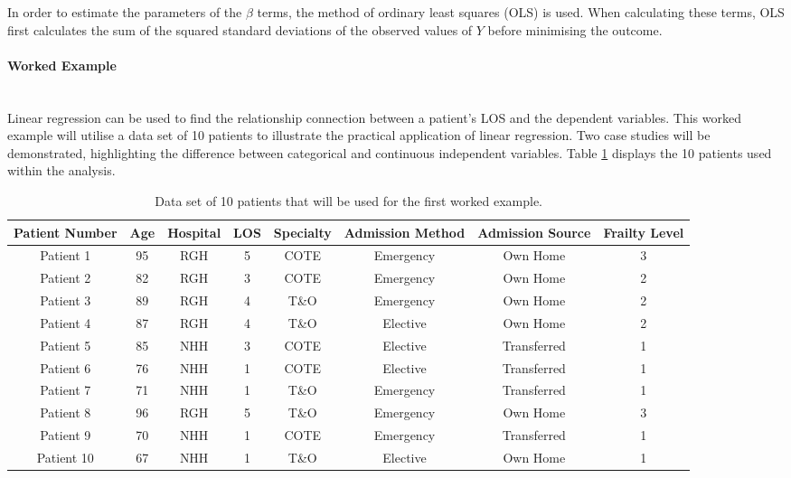 \documentclass[../thesis.tex]{subfiles}
\begin{document}
In order to estimate the parameters of the $\beta$ terms, the method of ordinary least squares (OLS) is used. When calculating these terms, OLS first calculates the sum of the squared standard deviations of the observed values of $Y$ before minimising the outcome.

\paragraph{Worked Example}\\

Linear regression can be used to find the relationship connection between a patient's LOS and the dependent variables.
This worked example will utilise a data set of 10 patients to illustrate the practical application of linear regression. Two case studies will be demonstrated, highlighting the difference between categorical and continuous independent variables. Table \ref{tab:WEtable} displays the 10 patients used within the analysis.

\begin{table}[h!]
    \centering
    \begin{adjustbox}{width=\columnwidth}
    \begin{tabular}{cccccccc}\toprule
       \textbf{Patient Number}  & \textbf{Age} & \textbf{Hospital} & \textbf{LOS} & \textbf{Specialty} &\textbf{Admission Method} & \textbf{Admission Source} & \textbf{Frailty Level} \\\midrule
        Patient 1 & 95 & RGH & 5 & COTE & Emergency & Own Home & 3 \\ 
        Patient 2 & 82 & RGH & 3 & COTE & Emergency & Own Home & 2 \\
        Patient 3 & 89 & RGH & 4& T\&O & Emergency & Own Home & 2 \\
        Patient 4 & 87 & RGH & 4 & T\&O & Elective & Own Home & 2 \\
        Patient 5 & 85 & NHH & 3 & COTE & Elective & Transferred & 1 \\
        Patient 6 & 76 & NHH & 1 & COTE & Elective & Transferred & 1\\
        Patient 7 & 71 & NHH & 1 & T\&O & Emergency & Transferred & 1 \\
        Patient 8 & 96 & RGH & 5 & T\&O & Emergency & Own Home & 3 \\
        Patient 9 & 70 & NHH & 1 & COTE & Emergency & Transferred & 1\\
        Patient 10 & 67 & NHH & 1 & T\&O & Elective & Own Home & 1\\\bottomrule
    \end{tabular}
    \end{adjustbox}
    \caption{Data set of 10 patients that will be used for the first worked example.}
    \label{tab:WEtable}
\end{table}
\end{document}

